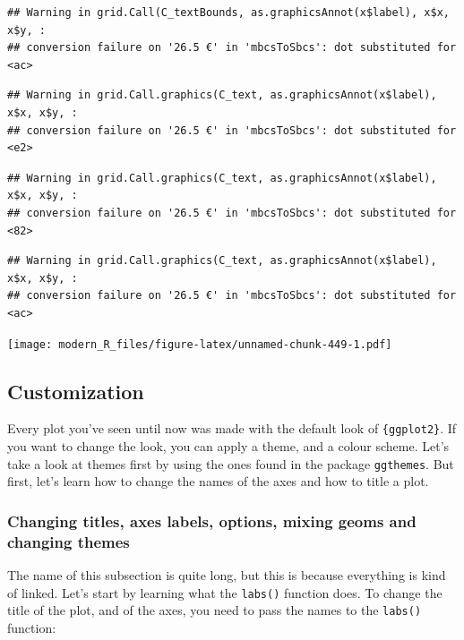 \documentclass[
]{article}
\begin{document}
\begin{verbatim}
## Warning in grid.Call(C_textBounds, as.graphicsAnnot(x$label), x$x, x$y, :
## conversion failure on '26.5 €' in 'mbcsToSbcs': dot substituted for <ac>
\end{verbatim}

\begin{verbatim}
## Warning in grid.Call.graphics(C_text, as.graphicsAnnot(x$label), x$x, x$y, :
## conversion failure on '26.5 €' in 'mbcsToSbcs': dot substituted for <e2>
\end{verbatim}

\begin{verbatim}
## Warning in grid.Call.graphics(C_text, as.graphicsAnnot(x$label), x$x, x$y, :
## conversion failure on '26.5 €' in 'mbcsToSbcs': dot substituted for <82>
\end{verbatim}

\begin{verbatim}
## Warning in grid.Call.graphics(C_text, as.graphicsAnnot(x$label), x$x, x$y, :
## conversion failure on '26.5 €' in 'mbcsToSbcs': dot substituted for <ac>
\end{verbatim}

\texttt{[image: modern\_R\_files/figure-latex/unnamed-chunk-449-1.pdf]}

\hypertarget{customization}{%
\subsection{Customization}\label{customization}}

Every plot you've seen until now was made with the default look of \texttt{\{ggplot2\}}. If you want to change
the look, you can apply a theme, and a colour scheme. Let's take a look at themes first by using the
ones found in the package \texttt{ggthemes}. But first, let's learn how to change the names of the axes
and how to title a plot.

\hypertarget{changing-titles-axes-labels-options-mixing-geoms-and-changing-themes}{%
\subsubsection{Changing titles, axes labels, options, mixing geoms and changing themes}\label{changing-titles-axes-labels-options-mixing-geoms-and-changing-themes}}

The name of this subsection is quite long, but this is because everything is kind of linked. Let's
start by learning what the \texttt{labs()} function does. To change the title of the plot, and of the axes,
you need to pass the names to the \texttt{labs()} function:
\end{document}

